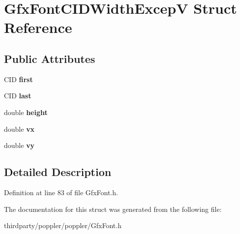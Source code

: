 \hypertarget{struct_gfx_font_c_i_d_width_excep_v}{}\section{Gfx\+Font\+C\+I\+D\+Width\+ExcepV Struct Reference}
\label{struct_gfx_font_c_i_d_width_excep_v}
\subsection*{Public Attributes}
\begin{DoxyCompactItemize}
\item 
\mbox{\label{struct_gfx_font_c_i_d_width_excep_v_a38698a855eef082685f873508ee0fea5}} 
C\+ID {\bfseries first}
\item 
\mbox{\label{struct_gfx_font_c_i_d_width_excep_v_a050032db988d930ad07f4c503c7eb6e7}} 
C\+ID {\bfseries last}
\item 
\mbox{\label{struct_gfx_font_c_i_d_width_excep_v_a0a862dccf594eed035e281a3754a541c}} 
double {\bfseries height}
\item 
\mbox{\label{struct_gfx_font_c_i_d_width_excep_v_a6c3b9d1880b07e8299a4472098eb4ba2}} 
double {\bfseries vx}
\item 
\mbox{\label{struct_gfx_font_c_i_d_width_excep_v_a94d51e69da2ced1c598937608e0d7a19}} 
double {\bfseries vy}
\end{DoxyCompactItemize}


\subsection{Detailed Description}


Definition at line 83 of file Gfx\+Font.\+h.



The documentation for this struct was generated from the following file\+:\begin{DoxyCompactItemize}
\item 
thirdparty/poppler/poppler/Gfx\+Font.\+h\end{DoxyCompactItemize}

